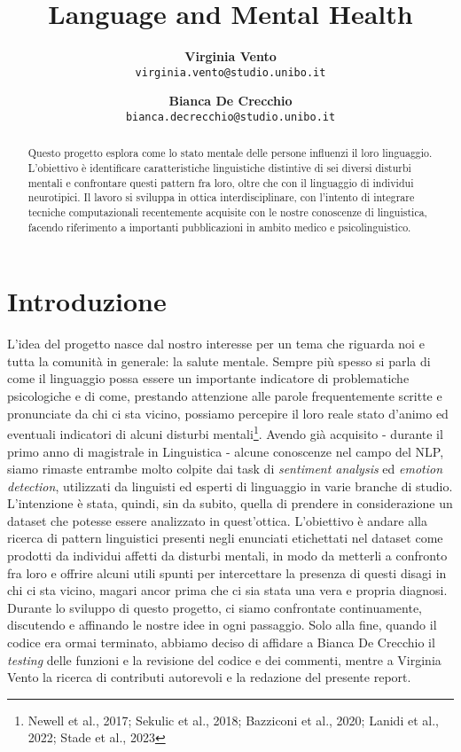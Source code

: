 \documentclass[11pt]{article}
\title{Language and Mental Health}
\author{
  \textbf{Virginia Vento}\\
  {\small \tt virginia.vento@studio.unibo.it} \\
  \and
  \textbf{Bianca De Crecchio}\\
  {\small \tt bianca.decrecchio@studio.unibo.it}
}
\begin{document}
\maketitle
\begin{abstract}
  Questo progetto esplora come lo stato mentale delle persone influenzi il loro linguaggio. L'obiettivo è identificare caratteristiche linguistiche distintive di sei diversi disturbi mentali e confrontare questi pattern fra loro, oltre che con il linguaggio di individui neurotipici. Il lavoro si sviluppa in ottica interdisciplinare, con l’intento di integrare tecniche computazionali recentemente acquisite con le nostre conoscenze di linguistica, facendo riferimento a importanti pubblicazioni in ambito medico e psicolinguistico. 
\end{abstract}

\section{Introduzione}

L’idea del progetto nasce dal nostro interesse per un tema che riguarda noi e tutta la comunità in generale: la salute mentale. Sempre più spesso si parla di come il linguaggio possa essere un importante indicatore di problematiche psicologiche e di come, prestando attenzione alle parole frequentemente scritte e pronunciate da chi ci sta vicino, possiamo percepire il loro reale stato d’animo ed eventuali indicatori di alcuni disturbi mentali\footnote{Newell et al., 2017; Sekulic et al., 2018; Bazziconi et al., 2020; Lanidi et al., 2022; Stade et al., 2023}. Avendo già acquisito - durante il primo anno di magistrale in Linguistica - alcune conoscenze nel campo del NLP, siamo rimaste entrambe molto colpite dai task di \textit{sentiment analysis} ed \textit{emotion detection}, utilizzati da linguisti ed esperti di linguaggio in varie branche di studio. L’intenzione è stata, quindi, sin da subito, quella di prendere in considerazione un dataset che potesse essere analizzato in quest’ottica. L’obiettivo è andare alla ricerca di pattern linguistici presenti negli enunciati etichettati nel dataset come prodotti da individui affetti da disturbi mentali, in modo da metterli a confronto fra loro e offrire alcuni utili spunti per intercettare la presenza di questi disagi in chi ci sta vicino, magari ancor prima che ci sia stata una vera e propria diagnosi. Durante lo sviluppo di questo progetto, ci siamo confrontate continuamente, discutendo e affinando le nostre idee in ogni passaggio. Solo alla fine, quando il codice era ormai terminato, abbiamo deciso di affidare a Bianca De Crecchio il \textit{testing} delle funzioni e la revisione del codice e dei commenti, mentre a Virginia Vento la ricerca di contributi autorevoli e la redazione del presente report.
\end{document}
